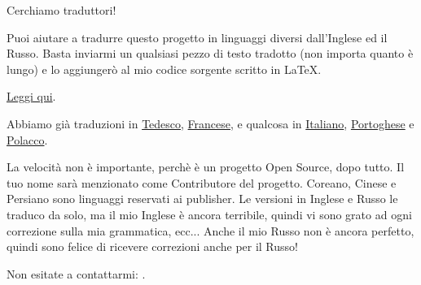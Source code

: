\vspace*{\fill}

\Huge Cerchiamo traduttori!

\normalsize

\bigskip
\bigskip
\bigskip

Puoi aiutare a tradurre questo progetto in linguaggi diversi dall'Inglese ed il Russo.
Basta inviarmi un qualsiasi pezzo di testo tradotto (non importa quanto è lungo) e lo aggiungerò al mio codice sorgente scritto in LaTeX.

\href{\GitHubBlobMasterURL/Translation.md}{Leggi qui}.

Abbiamo già traduzioni in \href{https://beginners.re/RE4B-DE.pdf}{Tedesco},
\href{https://beginners.re/RE4B-FR.pdf}{Francese}, e qualcosa in
\href{https://yurichev.com/tmp/RE4B-IT-partial.pdf}{Italiano},
\href{https://yurichev.com/tmp/RE4B-PTBR-lite2.pdf}{Portoghese} e
\href{https://yurichev.com/tmp/RE4B-PL.pdf}{Polacco}.

La velocità non è importante, perchè è un progetto Open Source, dopo tutto.
Il tuo nome sarà menzionato come Contributore del progetto.
Coreano, Cinese e Persiano sono linguaggi reservati ai publisher.
Le versioni in Inglese e Russo le traduco da solo, ma il mio Inglese è ancora terribile, quindi vi sono grato ad ogni correzione sulla mia grammatica, ecc...
Anche il mio Russo non è ancora perfetto, quindi sono felice di ricevere correzioni anche per il Russo!%

Non esitate a contattarmi: \GTT{\EMAIL}.

\vspace*{\fill}
\vfill
